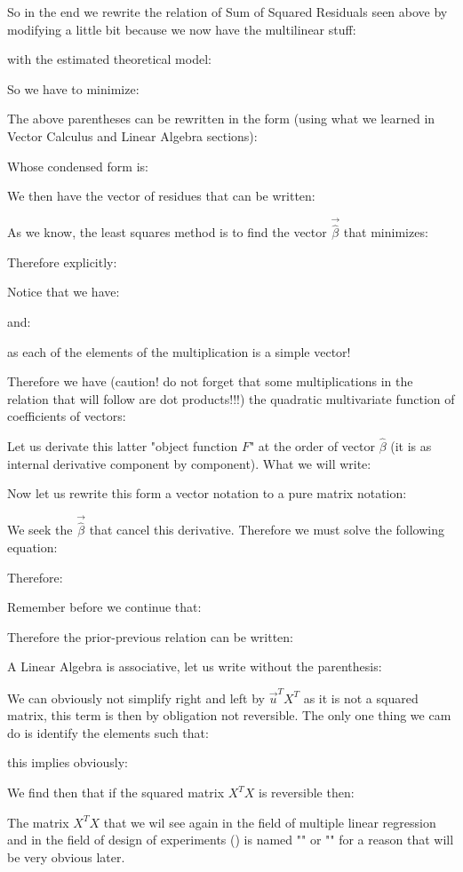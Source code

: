 	So in the end we rewrite the relation of Sum of Squared Residuals seen above by modifying a little bit because we now have the multilinear stuff:
	
	with the estimated theoretical model:
	
	So we have to minimize:
	
	The above parentheses can be rewritten in the form (using what we learned in Vector Calculus and Linear Algebra sections):
	
	Whose condensed form is:
	
	We then have the vector of residues that can be written:
	
	As we know, the least squares method is to find the vector $\vec{\hat{\beta}}$ that minimizes:
		
	Therefore explicitly:
	
	Notice that we have:
	
	and:
	
	as each of the elements of the multiplication is a simple vector!
	
	Therefore we have (caution! do not forget that some multiplications in the relation that will follow are dot products!!!) the quadratic multivariate function of coefficients of vectors:
	
	Let us derivate this latter "object function $F$" at the order of vector $\hat{\beta}$ (it is as internal derivative component by component). What we will write:
	
	Now let us rewrite this form a vector notation to a pure matrix notation:
	
	We seek the $\vec{\hat{\beta}}$ that cancel this derivative. Therefore we must solve the following equation:
	
	Therefore:
	
	Remember before we continue that:
	
	Therefore the prior-previous relation can be written:
	
	A Linear Algebra is associative, let us write without the parenthesis:
	
	We can obviously not simplify right and left by $\vec{u}^TX^T$ as it is not a squared matrix, this term is then by obligation not reversible. The only one thing we cam do is identify the elements such that:
	
	this implies obviously:
	
	We find then that if the squared matrix $X^TX$ is reversible then:
	
	The matrix $X^TX$ that we wil see again in the field of multiple linear regression and in the field of design of experiments () is named "" or "" for a reason that will be very obvious later.
	
